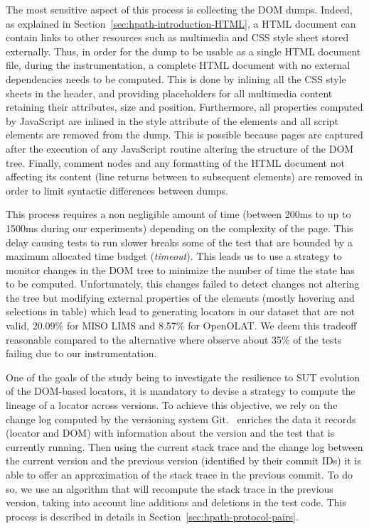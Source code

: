 The most sensitive aspect of this process is collecting the DOM dumps. Indeed, as explained in Section~\ref{sec:hpath-introduction-HTML}, a HTML document can contain links to other resources such as multimedia and CSS style sheet stored externally. Thus, in order for the dump to be usable as a single HTML document file, during the instrumentation, a complete HTML document with no external dependencies needs to be computed. This is done by inlining all the CSS style sheets in the header, and providing placeholders for all multimedia content retaining their attributes, size and position. Furthermore, all properties computed by JavaScript are inlined in the style attribute of the elements and all script elements are removed from the dump. This is possible because pages are captured after the execution of any JavaScript routine altering the structure of the DOM tree. Finally, comment nodes and any formatting of the HTML document not affecting its content (line returns between to subsequent elements) are removed in order to limit syntactic differences between dumps.

This process requires a non negligible amount of time (between 200ms to up to 1500ms during our experiments) depending on the complexity of the page. This delay causing tests to run slower breaks some of the test that are bounded by a maximum allocated time budget (\emph{timeout}). This leads us to use a strategy to monitor changes in the DOM tree to minimize the number of time the state has to be computed. Unfortunately, this changes failed to detect changes not altering the tree but modifying external properties of the elements (mostly hovering and selections in table) which lead to generating locators in our dataset that are not valid, 20.09\% for MISO LIMS and 8.57\% for OpenOLAT. We deem this tradeoff reasonable compared to the alternative where observe about 35\% of the tests failing due to our instrumentation.

One of the goals of the study being to investigate the resilience to SUT evolution of the DOM-based locators, it is mandatory to devise a strategy to compute the lineage of a locator across versions. To achieve this objective, we rely on the change log computed by the versioning system Git. \mercator\ enriches the data it records (locator and DOM) with information about the version and the test that is currently running. Then using the current stack trace and the change log between the current version and the previous version (identified by their commit IDs) it is able to offer an approximation of the stack trace in the previous commit. To do so, we use an algorithm that will recompute the stack trace in the previous version, taking into account line additions and deletions in the test code. This process is described in details in Section~\ref{sec:hpath-protocol-pairs}.

